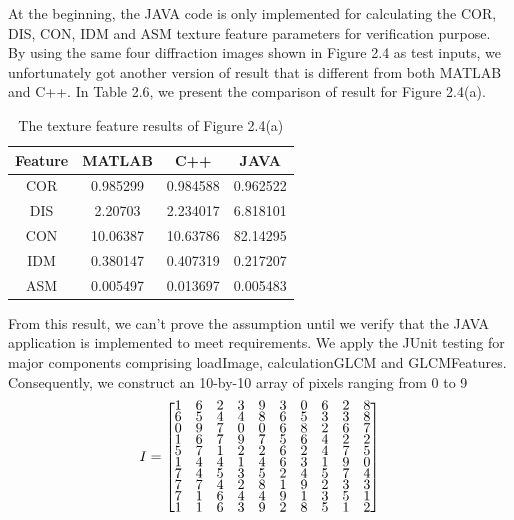 At the beginning, the JAVA code is only implemented for calculating the COR, DIS, CON, IDM and ASM texture feature parameters for verification purpose. By using the same four diffraction images shown in Figure 2.4 as test inputs, we unfortunately got another version of result that is different from both MATLAB and C++. In Table 2.6, we present the comparison of result for Figure 2.4(a). 
\begin{table}[!t]
\begin{center}
\begin{tabular}{||c c c c||}
\hline
Feature & MATLAB & C++ & JAVA\\[0.7ex]
\hline\hline
COR & 0.985299 & 0.984588 & 0.962522 \\
DIS & 2.20703 & 2.234017 & 6.818101\\
CON & 10.06387 & 10.63786 & 82.14295 \\
IDM & 0.380147 & 0.407319 & 0.217207 \\
ASM & 0.005497 & 0.013697 & 0.005483\\
\hline
\end{tabular}
\caption{The texture feature results of Figure 2.4(a)}
\end{center}
\end{table}
From this result, we can't prove the assumption until we verify that the JAVA application is implemented to meet requirements. We apply the JUnit testing for major components comprising loadImage, calculationGLCM and GLCMFeatures. Consequently, we construct an 10-by-10 array of pixels ranging from 0 to 9 
\begin{align*}
I = 
\renewcommand{\arraystretch}{0.5}
\begin{bmatrix}
    1 & 6 & 2 & 3 & 9 & 3 & 0 & 6 & 2 & 8\\
    6 & 5 & 4 & 4 & 8 & 6 & 5 & 3 & 3 & 8\\
    0 & 9 & 7 & 0 & 0 & 6 & 8 & 2 & 6 & 7\\
    1 & 6 & 7 & 9 & 7 & 5 & 6 & 4 & 2 & 2\\
    5 & 7 & 1 & 2 & 2 & 6 & 2 & 4 & 7 & 5\\
    1 & 4 & 4 & 1 & 4 & 6 & 3 & 1 & 9 & 0\\
    7 & 4 & 5 & 3 & 5 & 2 & 4 & 5 & 7 & 4\\
    7 & 7 & 4 & 2 & 8 & 1 & 9 & 2 & 3 & 3\\
    7 & 1 & 6 & 4 & 4 & 9 & 1 & 3 & 5 & 1\\
    1 & 1 & 6 & 3 & 9 & 2 & 8 & 5 & 1 & 2
\end{bmatrix}
\end{align*}
